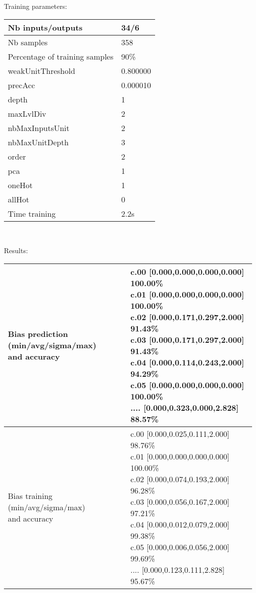 Training parameters:\\
\begin{center}
\begin{tabular}{|l|l|}
\hline
Nb inputs/outputs&34/6\\
\hline
Nb samples&358\\
\hline
Percentage of training samples&90\%\\
\hline
weakUnitThreshold&0.800000\\
\hline
precAcc&0.000010\\
\hline
depth&1\\
\hline
maxLvlDiv&2\\
\hline
nbMaxInputsUnit&2\\
\hline
nbMaxUnitDepth&3\\
\hline
order&2\\
\hline
pca&1\\
\hline
oneHot&1\\
\hline
allHot&0\\
\hline
Time training&2.2s\\
\hline
\end{tabular}\\
\end{center}\newline
Results:
\begin{center}
\begin{tabular}{|l|l|}
\hline
\makecell{Bias prediction (min/avg/sigma/max)\\and accuracy}&\makecell{c.00 [0.000,0.000,0.000,0.000] 100.00\%\\
c.01 [0.000,0.000,0.000,0.000] 100.00\%\\
c.02 [0.000,0.171,0.297,2.000] 91.43\%\\
c.03 [0.000,0.171,0.297,2.000] 91.43\%\\
c.04 [0.000,0.114,0.243,2.000] 94.29\%\\
c.05 [0.000,0.000,0.000,0.000] 100.00\%\\
.... [0.000,0.323,0.000,2.828] 88.57\%\\
}\\

\hline
\makecell{Bias training (min/avg/sigma/max)\\and accuracy}&\makecell{c.00 [0.000,0.025,0.111,2.000] 98.76\%\\
c.01 [0.000,0.000,0.000,0.000] 100.00\%\\
c.02 [0.000,0.074,0.193,2.000] 96.28\%\\
c.03 [0.000,0.056,0.167,2.000] 97.21\%\\
c.04 [0.000,0.012,0.079,2.000] 99.38\%\\
c.05 [0.000,0.006,0.056,2.000] 99.69\%\\
.... [0.000,0.123,0.111,2.828] 95.67\%\\
}\\
\hline
\end{tabular}\
\end{center}

